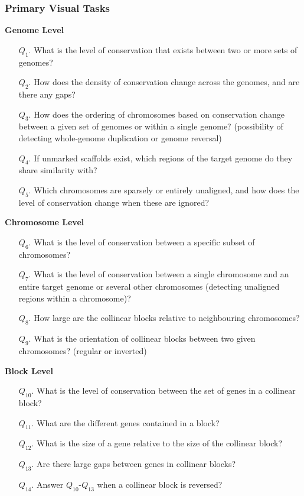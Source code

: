\subsubsection{Primary Visual Tasks}

\smallskip
\noindent
\textbf{Genome Level}
\smallskip
\begin{enumerate}
\item [$Q_1$.] What is the level of conservation that exists between two or more sets of genomes?
\item [$Q_2$.] How does the density of conservation change across the genomes, and are there any gaps?
\item [$Q_3$.] How does the ordering of chromosomes based on conservation change between a given set of genomes or within a single genome? (possibility of detecting whole-genome duplication or genome reversal)
\item [$Q_4$.] If unmarked scaffolds exist, which regions of the target genome do they share similarity with?
\item[$Q_5$.] Which chromosomes are sparsely or entirely unaligned, and how does the level of conservation change when these are ignored?
\end{enumerate}

\smallskip
\noindent
\textbf{Chromosome Level}
\smallskip
\begin{enumerate}
\item [$Q_6$.]What is the level of conservation between a specific subset of chromosomes?
\item [$Q_7$.] What is the level of conservation between a single chromosome and an entire target genome or several other chromosomes (detecting unaligned regions within a chromosome)?
\item [$Q_8$.] 
How large are the collinear blocks relative to neighbouring chromosomes?
\item [$Q_9$.]What is the orientation of collinear blocks between two given chromosomes? (regular or inverted)
\end{enumerate}

\smallskip
\noindent
\textbf{Block Level}
\smallskip
\begin{enumerate}
\item [$Q_{10}$.]What is the level of conservation between the set of genes in a collinear block?
\item [$Q_{11}$.] What are the different genes contained in a block?
\item [$Q_{12}$.] What is the size of a gene relative to the size of the collinear block?
\item [$Q_{13}$.] Are there large gaps between genes in collinear blocks?
\item [$Q_{14}$.] Answer $Q_{10}$-$Q_{13}$ when a collinear block is reversed?
\end{enumerate}

